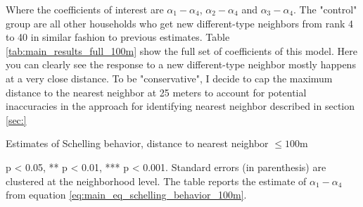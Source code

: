 \documentclass[../main.tex]{subfiles}
\begin{document}
Where the coefficients of interest are $\alpha_1-\alpha_4$, $\alpha_2-\alpha_4$ and $\alpha_3-\alpha_4$. The "control" group are all other households who get new different-type neighbors from rank 4 to 40 in similar fashion to previous estimates. Table \ref{tab:main_results_full_100m} show the full set of coefficients of this model. Here you can clearly see the response to a new different-type neighbor mostly happens at a very close distance. To be "conservative", I decide to cap the maximum distance to the nearest neighbor at 25 meters to account for potential inaccuracies in the approach for identifying nearest neighbor described in section \ref{sec:}   

\begin{table}[H]
    \centering
    \caption{Estimates of Schelling behavior, distance to nearest neighbor $\leq100$m }
    \label{tab:main_results_full_100m}
    \begin{threeparttable}
            
    \begin{tablenotes}[flushleft]
    \item \scriptsize * p < 0.05, ** p < 0.01, *** p < 0.001. Standard errors (in parenthesis) are clustered at the neighborhood level. The table reports the estimate of $\alpha_1 - \alpha_4$ from equation \ref{eq:main_eq_schelling_behavior_100m}. 
    \end{tablenotes}
    \end{threeparttable}
\end{table}
\end{document}
